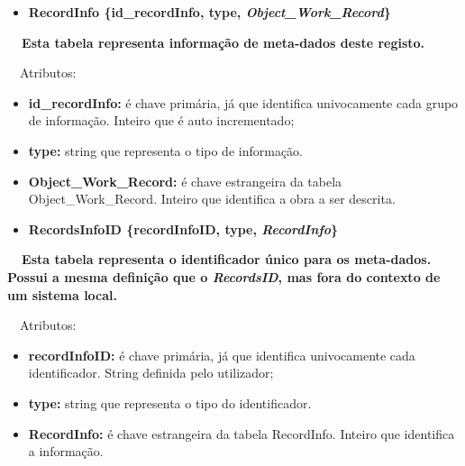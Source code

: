\documentclass[letterpaper]{article}
\newcommand\textstyleStrongEmphasis[1]{\textbf{#1}}
\newcommand\liststyleLi{%
\renewcommand\labelitemi{{\textbullet}}
\renewcommand\labelitemii{[27A2?]}
\renewcommand\labelitemiii{{\textbullet}}
\renewcommand\labelitemiv{{\textbullet}}
}
\newcommand\liststyleLvi{%
\renewcommand\labelitemi{[27A2?]}
\renewcommand\labelitemii{[27A2?]}
\renewcommand\labelitemiii{[27A2?]}
\renewcommand\labelitemiv{[27A2?]}
}
\begin{document}
\bigskip

\liststyleLi
\begin{itemize}
\item {\bfseries
RecordInfo\textmd{ \{}\textmd{id\_recordInfo}\textmd{, type,
}\textmd{\textit{Object\_Work\_Record}}\textmd{\}}}
\end{itemize}
{\bfseries
\foreignlanguage{english}{\textmd{\ \ Esta
}}\textstyleStrongEmphasis{\foreignlanguage{english}{\textmd{tabela}}}\foreignlanguage{english}{\textmd{
representa informa\c{c}\~ao de meta-dados deste registo.}}}


\bigskip

{
\ \ Atributos:}

\liststyleLvi
\begin{itemize}
\item {
\textbf{id\_}\textbf{recordInfo}\textbf{:} \'e chave prim\'aria, j\'a
que identifica univocamente cada grupo de informa\c{c}\~ao. Inteiro que
\'e auto incrementado;}
\item {
\textbf{type:} string que representa o tipo de informa\c{c}\~ao.}
\item {
\textbf{Object\_Work\_Record:}\textit{ }\'e chave estrangeira da tabela
Object\_Work\_Record. Inteiro que identifica a obra a ser descrita.}
\end{itemize}

\bigskip

\liststyleLi
\begin{itemize}
\item {\bfseries
RecordsInfoID\textmd{ \{}\textmd{recordInfoID}\textmd{, type,
}\textmd{\textit{RecordInfo}}\textmd{\}}}
\end{itemize}
{\bfseries
\foreignlanguage{english}{\textmd{\ \ Esta
}}\textstyleStrongEmphasis{\foreignlanguage{english}{\textmd{tabela}}}\foreignlanguage{english}{\textmd{
representa o identificador \'unico para os meta-dados. Possui a mesma
defini\c{c}\~ao que o
}}\foreignlanguage{english}{\textmd{\textit{RecordsID}}}\foreignlanguage{english}{\textmd{,
mas fora do contexto de um sistema local.}}}


\bigskip

{
\ \ Atributos:}

\liststyleLvi
\begin{itemize}
\item {
\textbf{recordInfoID}\textbf{:} \'e chave prim\'aria, j\'a que
identifica univocamente cada identificador. String definida pelo
utilizador;}
\item {
\textbf{type:} string que representa o tipo do identificador.}
\item {
\textbf{RecordInfo:}\textit{ }\'e chave estrangeira da tabela
RecordInfo. Inteiro que identifica a informa\c{c}\~ao.}
\end{itemize}
\end{document}
